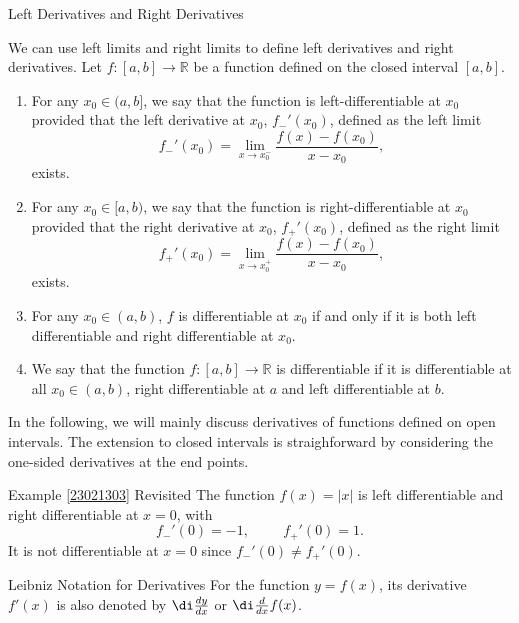 \begin{remark}{Left Derivatives and Right Derivatives}

We can use left limits and right limits to define left derivatives and right derivatives.  
Let $f:[a,b]\rightarrow \mathbb{R}$ be a function defined on the closed interval $[a,b]$.

\begin{enumerate}[1.]
\item 
For any $x_0\in (a, b]$, we say that the function is left-differentiable at $x_0$ provided that the left derivative at $x_0$, $f_-'(x_0)$, defined as the left limit
\[f_-'(x_0)=\lim_{x\to x_0^-}\frac{f(x)-f(x_0)}{x-x_0},\] exists.  

\item 
For any $x_0\in [a, b)$, we say that the function is right-differentiable at $x_0$ provided that the right derivative at $x_0$, $f_+'(x_0)$, defined as the right limit
\[f_+'(x_0)=\lim_{x\to x_0^+}\frac{f(x)-f(x_0)}{x-x_0},\] exists.  

\item For any $x_0\in (a, b)$, $f$ is differentiable at $x_0$ if and only if it is both left differentiable and right differentiable at $x_0$.

\item We say that the function  $f:[a,b]\rightarrow \mathbb{R}$ is differentiable if it is differentiable at all $x_0\in (a, b)$, right differentiable at $a$ and left differentiable at $b$.
\end{enumerate}

\end{remark}
 In the following, we will mainly discuss derivatives of functions defined on open intervals. The extension to closed intervals is straighforward by considering the one-sided derivatives at the end points.


\begin{example}{\linkt Example \ref{23021303} Revisited}
The function $f(x)=|x|$ is left differentiable and right differentiable at $x=0$, with 
\[f_-'(0)=-1,\hspace{1cm}f_+'(0)=1.\]
It is not differentiable at $x=0$ since $f_-'(0)\neq f_+'(0)$.
\end{example}

\begin{highlight}{Leibniz Notation for Derivatives}
For the function $y=f(x)$, its derivative $f'(x)$ is also denoted by $\di \frac{dy}{dx}$ or $\di \frac{d}{dx}f(x)$.
\end{highlight}

